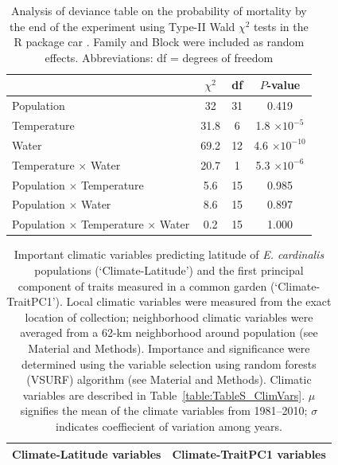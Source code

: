\documentclass[11pt, oneside]{article}
\newcommand{\pkg}[1]{{\fontseries{b}\selectfont #1}}
\begin{document}
\begin{table}[htbp]
	\fontsize{10}{12}
	\selectfont
	\caption[Analysis of deviance table, mortality]{Analysis of deviance table on the probability of mortality by the end of the experiment using Type-II Wald $\chi ^2$ tests in the R package \pkg{car} \citep{Fox_Weisberg_2011}. Family and Block were included as random effects. Abbreviations: df = degrees of freedom}
	\begin{center}
	\begin{tabular}{lccc}
	\toprule

  & $\chi ^2$ & df & $P$-value \\ \midrule
  Population & 32 & 
    31 & 0.419 \\
  Temperature & 31.8 & 
    6 & 1.8 $\times10^{-5}$ \\
  Water & 69.2 & 
    12 & 4.6 $\times10^{-10}$ \\
  Temperature $\times$ Water & 20.7 & 
    1 & 
    5.3 $\times10^{-6}$ \\
  Population $\times$ Temperature & 5.6 & 
    15 & 
    0.985 \\
  Population $\times$ Water & 8.6 & 
    15 & 
    0.897 \\
  Population $\times$ Temperature $\times$ Water & 
    0.2 & 
    15 & 
    1.000 \\	\bottomrule
	\end{tabular}
	\label{table:TableS_fitMort}
	\end{center}
\end{table}


\begin{table}[ht]
	\fontsize{10}{12}
	\selectfont
  \caption[Important climatic variables]{Important climatic variables predicting latitude of \textit{E. cardinalis} populations (`Climate-Latitude') and the first principal component of traits measured in a common garden (`Climate-TraitPC1'). Local climatic variables were measured from the exact location of collection; neighborhood climatic variables were averaged from a 62-km neighborhood around population (see Material and Methods). Importance and significance were determined using the variable selection using random forests (VSURF) algorithm (see Material and Methods). Climatic variables are described in Table~\ref{table:TableS_ClimVars}. $\mu$ signifies the mean of the climate variables from 1981--2010; $\sigma$ indicates coeffiecient of variation among years. }
   \begin{center}
   \begin{tabular}{@{} ll @{}}
      \toprule
    	Climate-Latitude variables & Climate-TraitPC1 variables \\
      \midrule
			
			\bottomrule
   \end{tabular}
   \end{center}
   \label{table:TableS_ClimVarImp}
\end{table}
\end{document}
